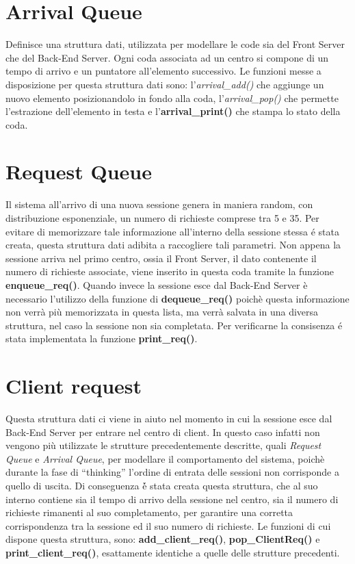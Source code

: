 \section{Arrival Queue}
Definisce una struttura dati, utilizzata per modellare le code sia del Front Server
che del Back-End Server. Ogni coda associata ad un centro si compone di un tempo di arrivo e un puntatore all'elemento successivo. 
Le funzioni messe a disposizione per questa struttura dati sono: 
l'\textit{arrival\_add()} che aggiunge un nuovo elemento posizionandolo in fondo alla coda, l'\textit{arrival\_pop()} 
che permette l'estrazione dell'elemento in testa e l'\textbf{arrival\_print()} che stampa lo stato della coda.

\section{Request Queue}
Il sistema all'arrivo di una nuova sessione genera in maniera random,
con distribuzione esponenziale, un numero di richieste comprese tra 5 e 35.
Per evitare di memorizzare tale informazione all'interno della sessione stessa
\'e stata creata, questa struttura dati adibita a raccogliere tali parametri.
Non appena la sessione arriva nel primo centro, ossia il Front Server, il dato 
contenente il numero di richieste associate, viene inserito in questa coda tramite la funzione 
\textbf{enqueue\_req()}. Quando invece la sessione esce dal Back-End Server è necessario
l'utilizzo della funzione di \textbf{dequeue\_req()} poichè questa informazione non verrà pi\`u
memorizzata in questa lista, ma verrà salvata in una diversa struttura, nel caso la sessione non sia completata.
Per verificarne la consisenza \'e stata implementata la funzione \textbf{print\_req()}.

\section{Client request}
Questa struttura dati ci viene in aiuto nel momento in cui la sessione 
esce dal Back-End Server per entrare nel centro di client. In questo caso 
infatti non vengono pi\`u utilizzate le strutture precedentemente descritte,
quali \textit{Request Queue} e \textit{Arrival Queue}, per modellare il comportamento 
del sistema, poichè durante la fase di ``thinking'' l'ordine di entrata delle sessioni 
non corrisponde a quello di uscita. Di conseguenza \'è stata creata questa struttura,
che al suo interno contiene sia il tempo di arrivo della sessione nel centro, sia il numero
di richieste rimanenti al suo completamento, per garantire una corretta corrispondenza tra la sessione ed il suo numero di richieste.
Le funzioni di cui dispone questa struttura, sono: 
\textbf{add\_client\_req()}, \textbf{pop\_ClientReq()} e 
\textbf{print\_client\_req()}, esattamente identiche a quelle delle strutture 
precedenti.

